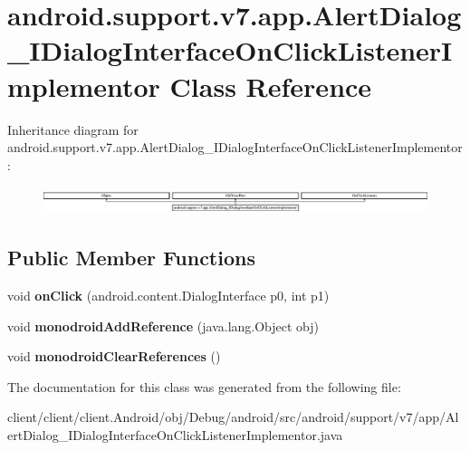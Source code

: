 \hypertarget{classandroid_1_1support_1_1v7_1_1app_1_1AlertDialog__IDialogInterfaceOnClickListenerImplementor}{}\section{android.\+support.\+v7.\+app.\+Alert\+Dialog\+\_\+\+I\+Dialog\+Interface\+On\+Click\+Listener\+Implementor Class Reference}
\label{classandroid_1_1support_1_1v7_1_1app_1_1AlertDialog__IDialogInterfaceOnClickListenerImplementor}
Inheritance diagram for android.\+support.\+v7.\+app.\+Alert\+Dialog\+\_\+\+I\+Dialog\+Interface\+On\+Click\+Listener\+Implementor\+:\begin{figure}[H]
\begin{center}
\leavevmode
\includegraphics[height=0.790960cm]{classandroid_1_1support_1_1v7_1_1app_1_1AlertDialog__IDialogInterfaceOnClickListenerImplementor}
\end{center}
\end{figure}
\subsection*{Public Member Functions}
\begin{DoxyCompactItemize}
\item 
\hypertarget{classandroid_1_1support_1_1v7_1_1app_1_1AlertDialog__IDialogInterfaceOnClickListenerImplementor_a8e35c027fd2de981ed97054edd6cb86f}{}void {\bfseries on\+Click} (android.\+content.\+Dialog\+Interface p0, int p1)\label{classandroid_1_1support_1_1v7_1_1app_1_1AlertDialog__IDialogInterfaceOnClickListenerImplementor_a8e35c027fd2de981ed97054edd6cb86f}

\item 
\hypertarget{classandroid_1_1support_1_1v7_1_1app_1_1AlertDialog__IDialogInterfaceOnClickListenerImplementor_a7625377f1befd57755de35ba74a4fb9f}{}void {\bfseries monodroid\+Add\+Reference} (java.\+lang.\+Object obj)\label{classandroid_1_1support_1_1v7_1_1app_1_1AlertDialog__IDialogInterfaceOnClickListenerImplementor_a7625377f1befd57755de35ba74a4fb9f}

\item 
\hypertarget{classandroid_1_1support_1_1v7_1_1app_1_1AlertDialog__IDialogInterfaceOnClickListenerImplementor_ab97868ba78e36937f05c4e816bb3cb5b}{}void {\bfseries monodroid\+Clear\+References} ()\label{classandroid_1_1support_1_1v7_1_1app_1_1AlertDialog__IDialogInterfaceOnClickListenerImplementor_ab97868ba78e36937f05c4e816bb3cb5b}

\end{DoxyCompactItemize}


The documentation for this class was generated from the following file\+:\begin{DoxyCompactItemize}
\item 
client/client/client.\+Android/obj/\+Debug/android/src/android/support/v7/app/Alert\+Dialog\+\_\+\+I\+Dialog\+Interface\+On\+Click\+Listener\+Implementor.\+java\end{DoxyCompactItemize}
